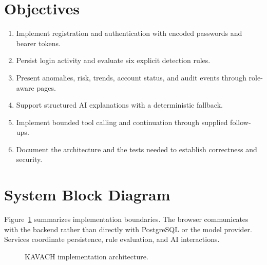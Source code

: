 \section{Objectives}
\begin{enumerate}
\item Implement registration and authentication with encoded passwords and bearer tokens.
\item Persist login activity and evaluate six explicit detection rules.
\item Present anomalies, risk, trends, account status, and audit events through role-aware pages.
\item Support structured AI explanations with a deterministic fallback.
\item Implement bounded tool calling and continuation through supplied follow-ups.
\item Document the architecture and the tests needed to establish correctness and security.
\end{enumerate}

\section{System Block Diagram}
Figure~\ref{fig:architecture} summarizes implementation boundaries. The browser communicates with the backend rather than directly with PostgreSQL or the model provider. Services coordinate persistence, rule evaluation, and AI interactions.
\begin{figure}[htbp]\centering{}\caption{KAVACH implementation architecture.}\label{fig:architecture}\end{figure}


